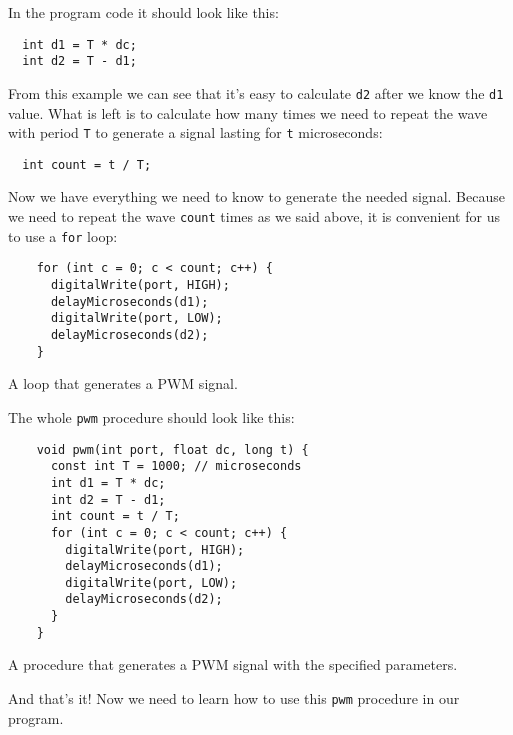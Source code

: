 \documentclass[../sparc.tex]{subfiles}
\begin{document}
In the program code it should look like this:

\begin{verbatim}
  int d1 = T * dc;
  int d2 = T - d1;
\end{verbatim}

From this example we can see that it's easy to calculate \texttt{d2} after we
know the \texttt{d1} value.  What is left is to calculate how many times we need
to repeat the wave with period \texttt{T} to generate a signal lasting for
\texttt{t} microseconds:

\begin{verbatim}
  int count = t / T;
\end{verbatim}

Now we have everything we need to know to generate the needed signal.  Because
we need to repeat the wave \texttt{count} times as we said above, it is
convenient for us to use a \texttt{for} loop:

\begin{listing}[H]
  \begin{verbatim}
    for (int c = 0; c < count; c++) {
      digitalWrite(port, HIGH);
      delayMicroseconds(d1);
      digitalWrite(port, LOW);
      delayMicroseconds(d2);
    }
  \end{verbatim}
  \label{listing:pwm-cycle}
  \caption{A loop that generates a PWM signal.}
\end{listing}

The whole \texttt{pwm} procedure should look like this:

\begin{listing}[H]
  \begin{verbatim}
    void pwm(int port, float dc, long t) {
      const int T = 1000; // microseconds
      int d1 = T * dc;
      int d2 = T - d1;
      int count = t / T;
      for (int c = 0; c < count; c++) {
        digitalWrite(port, HIGH);
        delayMicroseconds(d1);
        digitalWrite(port, LOW);
        delayMicroseconds(d2);
      }
    }
  \end{verbatim}
  \label{listing:pwm-procedure}
  \caption{A procedure that generates a PWM signal with the specified
    parameters.}
\end{listing}

And that's it!  Now we need to learn how to use this \texttt{pwm} procedure in
our program.
\end{document}
